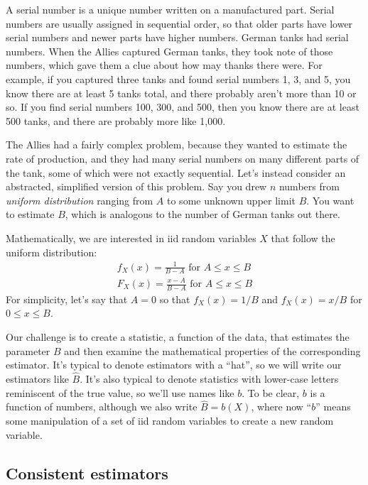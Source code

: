 A serial number is a unique number written on a manufactured part. Serial numbers
are usually assigned in sequential order, so that older parts have lower
serial numbers and newer parts have higher numbers. German tanks had serial
numbers. When
the Allies captured German tanks, they took note of those numbers, which gave
them a clue about how may thanks there were. For example, if you captured three
tanks and found serial numbers 1, 3, and 5, you know there are at least 5 tanks
total, and there probably aren't more than 10 or so. If you find serial numbers
100, 300, and 500, then you know there are at least 500 tanks, and there are
probably more like 1,000.

The Allies had a fairly complex problem, because they wanted to estimate the
rate of production, and they had many serial numbers on many different parts
of the tank, some of which were not
exactly sequential. Let's instead consider an abstracted, simplified version of
this problem. Say you drew $n$ numbers from \emph{uniform distribution} ranging
from $A$ to some unknown upper limit $B$. You want to estimate $B$, which is
analogous to the number of German tanks out there.

Mathematically, we are interested in iid random variables $X$ that follow the
uniform distribution:
\begin{gather*}
    f_X(x) = \frac{1}{B-A} \text{ for } A \leq x \leq B \\
    F_X(x) = \frac{x-A}{B-A} \text{ for } A \leq x \leq B
\end{gather*}
For simplicity, let's say that $A=0$ so that $f_X(x) = 1/B$ and $f_X(x) = x/B$
for $0 \leq x \leq B$.

Our challenge is to create a statistic, a function of the data, that estimates
the parameter $B$ and then examine the mathematical properties of the corresponding estimator. It's typical to denote estimators with a
``hat'', so we will write our estimators like $\hat{B}$. It's also typical to denote
statistics with lower-case letters reminiscent of the true value, so we'll
use names like $b$. To be clear, $b$ is a function of numbers, although we also
write $\hat{B} = b(X)$, where now ``$b$'' means some manipulation of a set of iid
random variables to create a new random variable.

\subsection{Consistent estimators}

